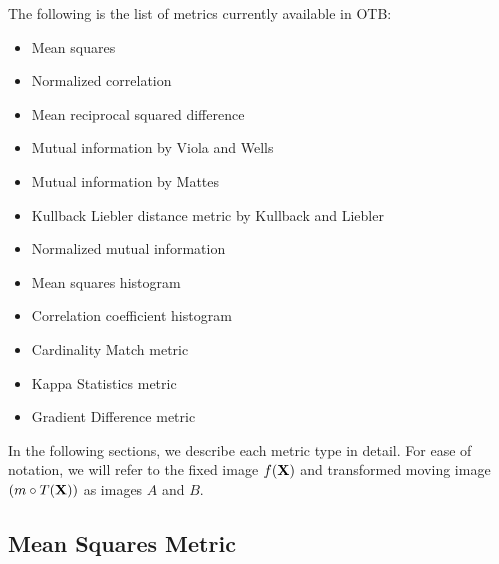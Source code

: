 The following is the list of metrics currently available in OTB:
\begin{itemize}
\item Mean squares\\ 
\item Normalized correlation \\ 
\item Mean reciprocal squared difference \\  
\item Mutual information by Viola and Wells \\ 
\item Mutual information by Mattes \\ 
\item Kullback Liebler distance metric by Kullback and Liebler \\ 
\item Normalized mutual information \\ 
\item Mean squares histogram \\ 
\item Correlation coefficient histogram \\ 
\item Cardinality Match metric \\ 
\item Kappa Statistics metric\\ 
\item Gradient Difference metric \\ 
\end{itemize}

In the following sections, we describe each metric type in detail. 
For ease of notation, we will refer to the fixed image $f(\bf{X})$ 
and transformed moving image $(m \circ T(\bf{X}))$ as images $A$ and $B$.

\subsection{Mean Squares Metric}
\label{sec:MeanSquaresMetric}

